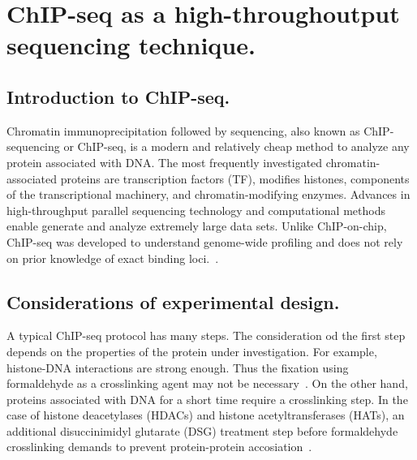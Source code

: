 \chapter{ChIP-seq as a high-throughoutput sequencing technique.}

\section{Introduction to ChIP-seq.}

Chromatin immunoprecipitation followed by sequencing, also known as ChIP-sequencing or ChIP-seq, is a modern and relatively cheap method to analyze any protein associated with DNA. 
The most frequently investigated chromatin-associated proteins are transcription factors (TF), modifies histones, components of the transcriptional machinery, and chromatin-modifying enzymes.
Advances in high-throughput parallel sequencing technology and computational methods enable generate and analyze extremely large data sets. 
Unlike ChIP-on-chip, ChIP-seq was developed to understand genome-wide profiling and does not rely on prior knowledge of exact binding loci.~\cite{park2009chip}.














\section{Considerations of experimental design.}

A typical ChIP-seq protocol has many steps. 
The consideration od the first step depends on the properties of the protein under investigation. 
For example, histone-DNA interactions are strong enough. 
Thus the fixation using formaldehyde as a crosslinking agent may not be necessary~\cite{barski2008identification}. 
On the other hand, proteins associated with DNA for a short time require a crosslinking step. 
In the case of histone deacetylases (HDACs) and histone acetyltransferases (HATs), an additional disuccinimidyl glutarate (DSG) treatment step before formaldehyde crosslinking demands to prevent protein-protein accosiation~\cite{wang2009genome}. 

